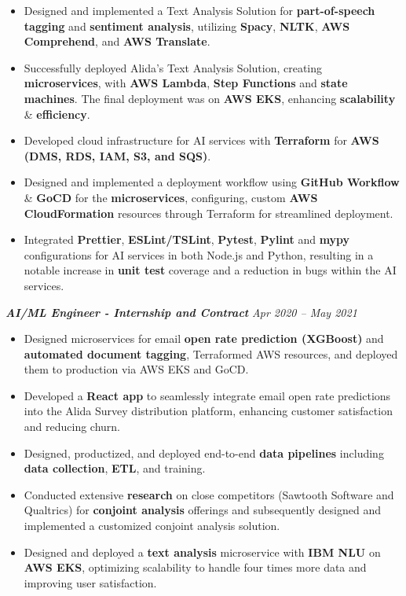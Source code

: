 \documentclass[11pt,a4paper]{article}
\newcommand{\resumeItem}[1]{\item #1}
\begin{document}
\begin{itemize}[leftmargin=1.5em, itemsep=1pt, topsep=3pt, label=\textopenbullet]
  \resumeItem{Designed and implemented a Text Analysis Solution for \textbf{part-of-speech tagging} and \textbf{sentiment analysis}, utilizing \textbf{Spacy}, \textbf{NLTK}, \textbf{AWS Comprehend}, and \textbf{AWS Translate}.}
  \resumeItem{Successfully deployed Alida's Text Analysis Solution, creating \textbf{microservices}, with \textbf{AWS Lambda}, \textbf{Step Functions} and \textbf{state machines}. The final deployment was on \textbf{AWS EKS}, enhancing \textbf{scalability} \& \textbf{efficiency}.}
  \resumeItem{Developed cloud infrastructure for AI services with \textbf{Terraform} for \textbf{AWS (DMS, RDS, IAM, S3, and SQS)}.}
  \resumeItem{Designed and implemented a deployment workflow using \textbf{GitHub Workflow} \& \textbf{GoCD} for the \textbf{microservices}, configuring, custom \textbf{AWS CloudFormation} resources through Terraform for streamlined deployment.}
  \resumeItem{Integrated \textbf{Prettier}, \textbf{ESLint/TSLint}, \textbf{Pytest}, \textbf{Pylint} and \textbf{mypy} configurations for AI services in both Node.js and Python, resulting in a notable increase in \textbf{unit test} coverage and a reduction in bugs within the AI services.}
\end{itemize}

\vspace{4pt}
\noindent\textit{\textbf{AI/ML Engineer - Internship and Contract}} \hfill \textit{Apr 2020 -- May 2021}

\begin{itemize}[leftmargin=1.5em, itemsep=1pt, topsep=3pt, label=\textopenbullet]
  \resumeItem{Designed microservices for email \textbf{open rate prediction (XGBoost)} and \textbf{automated document tagging}, Terraformed AWS resources, and deployed them to production via AWS EKS and GoCD.}
  \resumeItem{Developed a \textbf{React app} to seamlessly integrate email open rate predictions into the Alida Survey distribution platform, enhancing customer satisfaction and reducing churn.}
  \resumeItem{Designed, productized, and deployed end-to-end \textbf{data pipelines} including \textbf{data collection}, \textbf{ETL}, and training.}
  \resumeItem{Conducted extensive \textbf{research} on close competitors (Sawtooth Software and Qualtrics) for \textbf{conjoint analysis} offerings and subsequently designed and implemented a customized conjoint analysis solution.}
  \resumeItem{Designed and deployed a \textbf{text analysis} microservice with \textbf{IBM NLU} on \textbf{AWS EKS}, optimizing scalability to handle four times more data and improving user satisfaction.}
\end{itemize}
\end{document}
